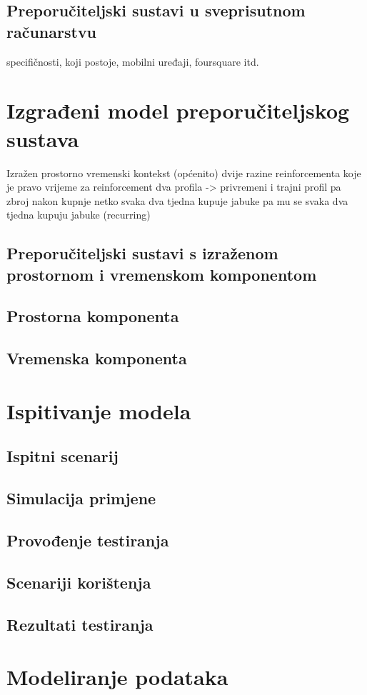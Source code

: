 \documentclass[times, utf8, diplomski, numeric]{fer}
\begin{document}
\section{Preporučiteljski sustavi u sveprisutnom računarstvu}
specifičnosti, koji postoje, mobilni uređaji, foursquare itd.
\chapter{Izgrađeni model preporučiteljskog sustava}
Izražen prostorno vremenski kontekst (općenito)
dvije razine reinforcementa
koje je pravo vrijeme za reinforcement
dva profila -> privremeni i trajni profil pa zbroj nakon kupnje
netko svaka dva tjedna kupuje jabuke pa mu se svaka dva tjedna kupuju jabuke
(recurring) 
\section{Preporučiteljski sustavi s izraženom prostornom i vremenskom
komponentom}
\section{Prostorna komponenta}
\section{Vremenska komponenta}
\chapter{Ispitivanje modela}
\section{Ispitni scenarij}
\section{Simulacija primjene}
\section{Provođenje testiranja}
\section{Scenariji korištenja}
\section{Rezultati testiranja}

\chapter{Modeliranje podataka}
\end{document}
